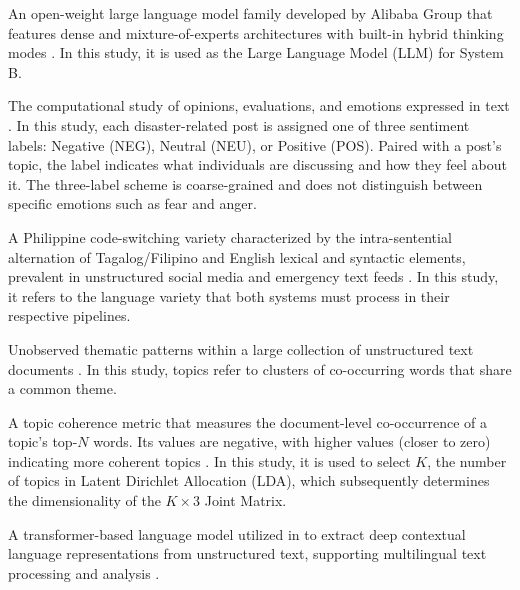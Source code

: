 \begin{description}[style=sameline,leftmargin=0pt]
	\item[Qwen3.] An open-weight large language model family developed by Alibaba Group that features dense and mixture-of-experts architectures with built-in hybrid thinking modes \parencite{yang_2025}. In this study, it is used as the Large Language Model (LLM) for System B.

	\item[Sentiment Analysis / Sentiment Classification.] The computational study of opinions, evaluations, and emotions expressed in text \parencite{katrekar2019introduction}. In this study, each disaster-related post is assigned one of three sentiment labels: Negative (NEG), Neutral (NEU), or Positive (POS). Paired with a post's topic, the label indicates what individuals are discussing and how they feel about it. The three-label scheme is coarse-grained and does not distinguish between specific emotions such as fear and anger.

	\item[Taglish.] A Philippine code-switching variety characterized by the intra-sentential alternation of Tagalog/Filipino and English lexical and syntactic elements, prevalent in unstructured social media and emergency text feeds \parencite{lesada2017taglish}. In this study, it refers to the language variety that both systems must process in their respective pipelines.

	\item[Topics.] Unobserved thematic patterns within a large collection of unstructured text documents \parencite{zang2026}. In this study, topics refer to clusters of co-occurring words that share a common theme.

	\item[UMass Coherence.] A topic coherence metric that measures the document-level co-occurrence of a topic's top-\(N\) words. Its values are negative, with higher values (closer to zero) indicating more coherent topics \parencite{mimno2011}. In this study, it is used to select \(K\), the number of topics in Latent Dirichlet Allocation (LDA), which subsequently determines the dimensionality of the \(K \times 3\) Joint Matrix.

	\item[XLM-RoBERTa (Cross-lingual Language Model - Robustly Optimized BERT Pretraining Approach).] A transformer-based language model utilized in \sysA{} to extract deep contextual language representations from unstructured text, supporting multilingual text processing and analysis \parencite{barbieri-etal-2022-xlm}.

\end{description} 
